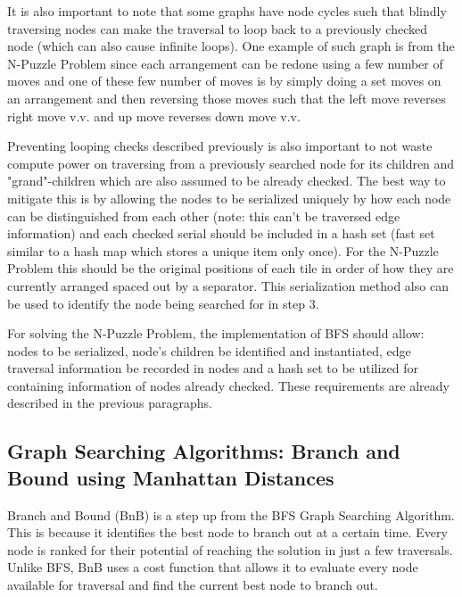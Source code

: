 \par It is also important to note that some graphs have node cycles such that blindly traversing nodes can make the traversal to loop back to a previously checked node (which can also cause infinite loops). One example of such graph is from the N-Puzzle Problem since each arrangement can be redone using a few number of moves and one of these few number of moves is by simply doing a set moves on an arrangement and then reversing those moves such that the left move reverses right move v.v. and up move reverses down move v.v.

\par Preventing looping checks described previously is also important to not waste compute power on traversing from a previously searched node for its children and "grand"-children which are also assumed to be already checked. The best way to mitigate this is by allowing the nodes to be serialized uniquely by how each node can be distinguished from each other (note: this can't be traversed edge information) and each checked serial should be included in a hash set (fast set similar to a hash map which stores a unique item only once). For the N-Puzzle Problem this should be the original positions of each tile in order of how they are currently arranged spaced out by a separator. This serialization method also can be used to identify the node being searched for in step 3.\cite{hsh}

\par For solving the N-Puzzle Problem, the implementation of BFS should allow: nodes to be serialized, node's children be identified and instantiated, edge traversal information be recorded in nodes and a hash set to be utilized for containing information of nodes already checked. These requirements are already described in the previous paragraphs.

\subsection{Graph Searching Algorithms: Branch and Bound using Manhattan Distances}

\par Branch and Bound (BnB) is a step up from the BFS Graph Searching Algorithm. This is because it identifies the best node to branch out at a certain time. Every node is ranked for their potential of reaching the solution in just a few traversals. Unlike BFS, BnB uses a cost function that allows it to evaluate every node available for traversal and find the current best node to branch out.\cite{bnb}

